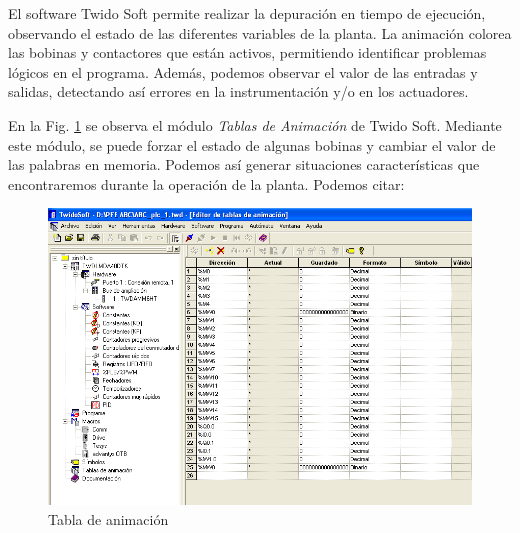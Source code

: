 El software Twido Soft permite realizar la depuración
en tiempo de ejecución, observando el estado de las diferentes variables
de la planta.
La animación colorea las bobinas y contactores que están activos, permitiendo
identificar problemas lógicos en el programa.
Además, podemos observar el valor de las entradas y salidas, detectando así
errores en la instrumentación y/o en los actuadores.

En la Fig. \ref{img:twidosoftdebug} se observa el módulo \emph{Tablas
de Animación} de Twido Soft.
Mediante este módulo, se puede forzar el estado de algunas bobinas y cambiar el
valor de las palabras en memoria.
Podemos así generar situaciones características que encontraremos durante la
operación de la planta.
Podemos citar:

\begin{figure}[ht]
	\centering
	\includegraphics[width=.8\textwidth]
	{Cap4-ProgramacionPLC/images/twidosoftdebug.png}
	\caption{Tabla de animación}
	\label{img:twidosoftdebug}
\end{figure}

